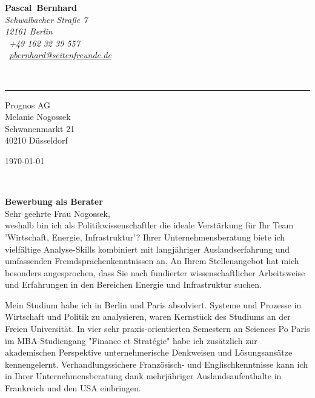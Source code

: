 \documentclass[11pt,a4paper]{article}
\def\firstname{Pascal}
\def\familyname{Bernhard}
\begin{document}
\sffamily   %
\hfill%
\begin{minipage}[t]{.6\textwidth}
	\raggedleft%
	{\bfseries {\color{firstnamecolor}\firstname}~{\color{familynamecolor}\familyname}}\\[.35ex]
	\small\itshape%
	Schwalbacher Straße 7\\
	12161 Berlin\\[.35ex]
	\Mobilefone~+49 162 32 39 557 \\
	\Letter~\href{mailto:pbernhard@seitenfreunde.de}{pbernhard@seitenfreunde.de}
\end{minipage}\\[0.5em]
%
{\color{firstnamecolor}\rule{\textwidth}{.25ex}}
%
\begin{minipage}[t]{.4\textwidth}
	\raggedright%
	\vspace*{1em}
	Prognos AG \\
	Melanie Nogossek\\[.35ex]
	\small%
	Schwanenmarkt 21\\
	40210 Düsseldorf
\end{minipage}
%
\hfill
%
\begin{minipage}[t]{.4\textwidth}
	\raggedleft %
	\today
\end{minipage}\\[1em]
\raggedright

{\bfseries \color{familynamecolor}Bewerbung als Berater}\\[1.5em]

Sehr geehrte Frau Nogossek,\\[1em]
%
weshalb bin ich als Politikwissenschaftler die ideale Verstärkung für Ihr Team 'Wirtschaft, Energie, Infrastruktur'? Ihrer Unternehmensberatung biete ich vielfältige Analyse-Skills kombiniert mit langjähriger Auslandserfahrung und umfassenden Fremdsprachenkenntnissen an. An Ihrem Stellenangebot hat mich besonders angesprochen, dass Sie nach fundierter wissenschaftlicher Arbeitsweise und Erfahrungen in den Bereichen Energie und Infrastruktur suchen.


Mein Studium habe ich in Berlin und Paris absolviert. Systeme und Prozesse in Wirtschaft und Politik zu analysieren, waren Kernstück des Studiums an der Freien Universität. In vier sehr praxis-orientierten Semestern an Sciences Po Paris im MBA-Studiengang "Finance et Stratégie" habe ich zusätzlich zur akademischen Perspektive unternehmerische Denkweisen und Lösungsansätze kennengelernt. Verhandlungssichere Französisch- und Englischkenntnisse kann ich in Ihrer Unternehmensberatung dank mehrjähriger Auslandsaufenthalte in Frankreich und den USA einbringen.
\end{document}
